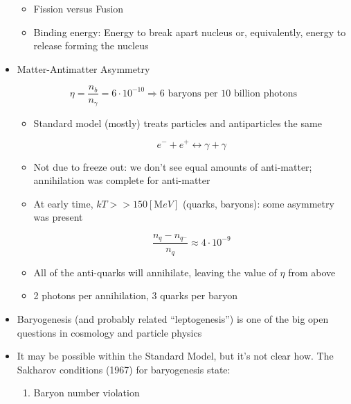 \begin{itemize}
    \begin{itemize}

      \item Fission versus Fusion

      \item Binding energy: Energy to break apart nucleus or, equivalently, energy to release forming the nucleus

    \end{itemize}

  \item Matter-Antimatter Asymmetry

    $$\eta=\frac{n_b}{n_{\gamma}}=6\cdot10^{-10}\Rightarrow\text{6 baryons per 10 billion photons}$$

    \begin{itemize}

      \item Standard model (mostly) treats particles and antiparticles the same

        $$e^{-}+e^{+} \leftrightarrow \gamma+\gamma$$

      \item Not due to freeze out: we don't see equal amounts of anti-matter; annihilation was complete for anti-matter

      \item At early time, $kT>>150[\si{\mega eV}]$ (quarks, baryons): some asymmetry was present

        $$\frac{n_q-n_{q^-}}{n_q}\approx 4\cdot10^{-9}$$

      \item All of the anti-quarks will annihilate, leaving the value of $\eta$ from above

      \item 2 photons per annihilation, 3 quarks per baryon

    \end{itemize}

  \item Baryogenesis (and probably related ``leptogenesis'') is one of the big open questions in cosmology and particle physics

  \item It may be possible within the Standard Model, but it's not clear how. The Sakharov conditions (1967) for baryogenesis state:

    \begin{enumerate}

      \item Baryon number violation


\end{enumerate}
\end{itemize}
